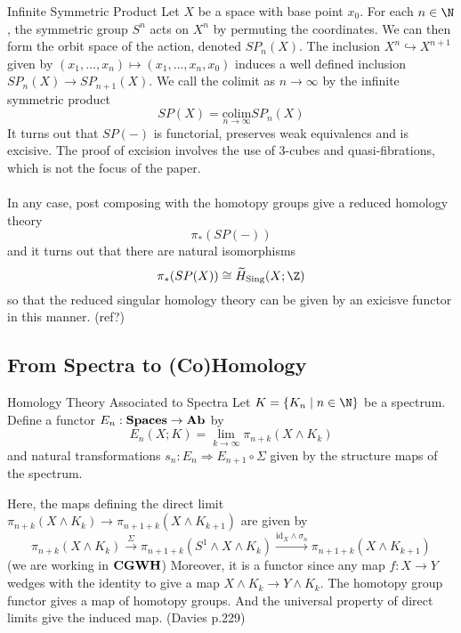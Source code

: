 \documentclass[a4paper]{article}
\begin{document}
\begin{eg}{Infinite Symmetric Product}{} Let $X$ be a space with base point $x_0$. For each $n\in\N$, the symmetric group $S^n$ acts on $X^n$ by permuting the coordinates. We can then form the orbit space of the action, denoted $SP_n(X)$. The inclusion $X^n\hookrightarrow X^{n+1}$ given by $(x_1,\dots,x_n)\mapsto(x_1,\dots,x_n,x_0)$ induces a well defined inclusion $SP_n(X)\to SP_{n+1}(X)$. We call the colimit as $n\to\infty$ by the infinite symmetric product $$SP(X)=\underset{n\to\infty}{\text{colim}}SP_n(X)$$ It turns out that $SP(-)$ is functorial, preserves weak equivalencs and is excisive. The proof of excision involves the use of 3-cubes and quasi-fibrations, which is not the focus of the paper. \\~\\

In any case, post composing with the homotopy groups give a reduced homology theory $$\pi_\ast(SP(-))$$ and it turns out that there are natural isomorphisms $$\pi_\ast(SP(X))\cong\widetilde{H}_{\text{Sing}}(X;\Z)$$ so that the reduced singular homology theory can be given by an exicisve functor in this manner. (ref?)
\end{eg}

\subsection{From Spectra to (Co)Homology}
\begin{defn}{Homology Theory Associated to Spectra}{} Let $K=\{K_n\;|\;n\in\N\}$ be a spectrum. Define a functor $E_n:\bold{Spaces}\to\bold{Ab}$ by $$E_n(X;K)=\lim_{k\to\infty}\pi_{n+k}(X\wedge K_k)$$ and natural transformations $s_n:E_n\Rightarrow E_{n+1}\circ\Sigma$ given by the structure maps of the spectrum. 
\end{defn}

Here, the maps defining the direct limit $\pi_{n+k}(X\wedge K_k)\to\pi_{n+1+k}(X\wedge K_{k+1})$ are given by $$\pi_{n+k}(X\wedge K_k)\overset{\Sigma}{\rightarrow}\pi_{n+1+k}(S^1\wedge X\wedge K_k)\overset{\text{id}_X\wedge\sigma_n}{\rightarrow}\pi_{n+1+k}(X\wedge K_{k+1})$$ (we are working in $\bold{CGWH}$) Moreover, it is a functor since any map $f:X\to Y$ wedges with the identity to give a map $X\wedge K_k\to Y\wedge K_k$. The homotopy group functor gives a map of homotopy groups. And the universal property of direct limits give the induced map. (Davies p.229)
\end{document}
